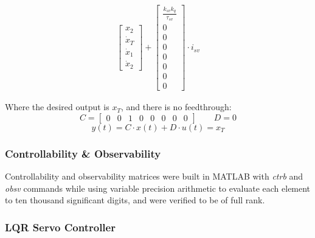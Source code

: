 \documentclass[9pt]{extarticle}
\begin{document}
\begin{align}
\begin{bmatrix}
        x_2 \\[6pt]
        \dot{x}_T \\[6pt]
        \dot{x}_1 \\[6pt]
        \dot{x}_2
    \end{bmatrix} +
    \begin{bmatrix}
        \frac{k_{sv}k_q}{\tau_{sv}}  \\[6pt]
        0 \\[6pt]
        0 \\[6pt]
        0 \\[6pt]
        0 \\[6pt]
        0 \\[6pt]
        0 \\[6pt]
        0
    \end{bmatrix}
    \cdot i_{sv}
\end{align}

\vspace{2mm}

Where the desired output is $x_T$, and there is no feedthrough: 
$$ C = \begin{bmatrix}
0 & 0 & 1 & 0 & 0 & 0 & 0 & 0
\end{bmatrix}
\quad \quad D = 0$$
\begin{equation}
y(t) = C\cdot x(t) + D\cdot u(t) = x_T
\end{equation}

\subsubsection{Controllability \& Observability}
Controllability and observability matrices were built in MATLAB with \emph{ctrb} and \emph{obsv} commands while using variable precision arithmetic to evaluate each element to ten thousand significant digits, and were verified to be of full rank.


\subsubsection{LQR Servo Controller}
\end{document}

